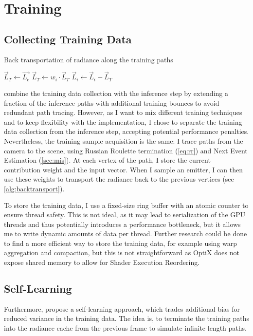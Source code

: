 \section{Training}

\subsection{Collecting Training Data}
\begin{algorithm}
    \caption{Back transportation of radiance along the training paths}
    \label{alg:backtransport}
    \begin{algorithmic}
        \State $\vec{L}_T \gets \vec{L_e}$
            \State $\vec{L}_T \gets w_i \cdot \vec{L}_T$ 
            \State $\vec{L}_i \gets \vec{L}_i + \vec{L}_T$ 
        \EndFor
    \end{algorithmic}
\end{algorithm}
\textcite{muller2021} combine the training data collection with the inference step by extending a fraction of the inference paths with additional training bounces to avoid redundant path tracing.
However, as I want to mix different training techniques and to keep flexibility with the implementation, I chose to separate the training data collection from the inference step, accepting potential performance penalties.
Nevertheless, the training sample acquisition is the same:
I trace paths from the camera to the scene, using Russian Roulette termination (\autoref{eq:rr}) and Next Event Estimation (\autoref{sec:mis}).
At each vertex of the path, I store the current contribution weight and the input vector.
When I sample an emitter, I can then use these weights to transport the radiance back to the previous vertices (see \autoref{alg:backtransport}).

To store the training data, I use a fixed-size ring buffer with an atomic counter to ensure thread safety.
This is not ideal, as it may lead to serialization of the GPU threads and thus potentially introduces a performance bottleneck, but it allows me to write dynamic amounts of data per thread.
Further research could be done to find a more efficient way to store the training data, for example using warp aggregation and compaction, but this is not straightforward as OptiX does not expose shared memory to allow for Shader Execution Reordering.

\subsection{Self-Learning}
Furthermore, \textcite{muller2021} propose a self-learning approach, which trades additional bias for reduced variance in the training data.
The idea is, to terminate the training paths into the radiance cache from the previous frame to simulate infinite length paths.

